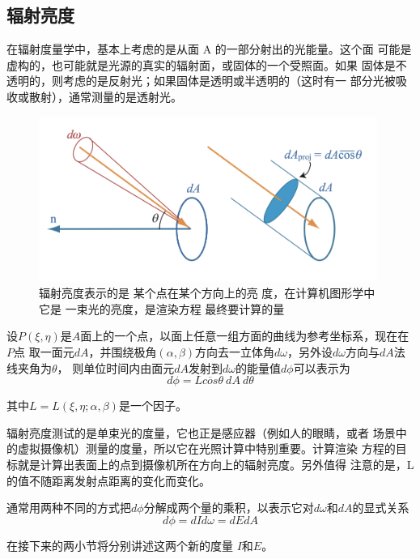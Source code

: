 \subsection*{辐射亮度}

在辐射度量学中，基本上考虑的是从面 A 的一部分射出的光能量。这个面
可能是虚构的，也可能就是光源的真实的辐射面，或固体的一个受照面。如果
固体是不透明的，则考虑的是反射光；如果固体是透明或半透明的（这时有一
部分光被吸收或散射），通常测量的是透射光。

\begin{figure}[H]
    \centering
    \includegraphics[scale=0.5]{figures/辐照亮度示意图.png}
    \caption{辐射亮度表示的是
    某个点在某个方向上的亮
    度，在计算机图形学中它是
    一束光的亮度，是渲染方程
    最终要计算的量}
\end{figure}

设$P(\xi,\eta)$是$A$面上的一个点，以面上任意一组方面的曲线为参考坐标系，现在在$P$点
取一面元$dA$，并围绕极角$(\alpha,\beta)$方向去一立体角$d\omega$，另外设$d\omega$方向与$dA$法线夹角为$\theta$，
则单位时间内由面元$dA$发射到$d\omega$的能量值$d\phi$可以表示为
\begin{equation}
    d\phi=L\overline{cos}\theta\ dA\ d\theta
\end{equation}

其中$L=L(\xi,\eta;\alpha,\beta)$是一个因子。

辐射亮度测试的是单束光的度量，它也正是感应器（例如人的眼睛，或者
场景中的虚拟摄像机）测量的度量，所以它在光照计算中特别重要。计算渲染
方程的目标就是计算出表面上的点到摄像机所在方向上的辐射亮度。另外值得
注意的是，L 的值不随距离发射点距离的变化而变化。

通常用两种不同的方式把$d\phi$分解成两个量的乘积，以表示它对$d\omega$和$d A$的显式关系
\begin{equation}
    d\phi=dId\omega=dEdA
\end{equation}

在接下来的两小节将分别讲述这两个新的度量 $I$和$E$。

